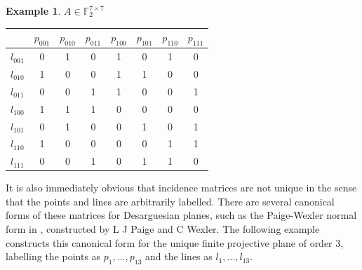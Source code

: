 \documentclass{report}
\newcommand{\F}{\mathbb{F}}
\theoremstyle{definition}\newtheorem*{definition}{Definition}
\theoremstyle{definition}\newtheorem*{example}{Example}
\theoremstyle{remark}\newtheorem*{remark}{Remark}
\begin{document}
\begin{example}
$ A \in \F_2^{7 \times 7} $ \\
\begin{center}
\begin{tabular}{|c|c|c|c|c|c|c|c|}
\hline
& $ p_{001} $ & $ p_{010} $ & $ p_{011} $ & $ p_{100} $ & $ p_{101} $ & $ p_{110} $ & $ p_{111} $ \\
\hline
$ l_{001} $ & 0 & 1 & 0 & 1 & 0 & 1 & 0 \\
\hline
$ l_{010} $ & 1 & 0 & 0 & 1 & 1 & 0 & 0 \\
\hline
$ l_{011} $ & 0 & 0 & 1 & 1 & 0 & 0 & 1 \\
\hline
$ l_{100} $ & 1 & 1 & 1 & 0 & 0 & 0 & 0 \\
\hline
$ l_{101} $ & 0 & 1 & 0 & 0 & 1 & 0 & 1 \\
\hline
$ l_{110} $ & 1 & 0 & 0 & 0 & 0 & 1 & 1 \\
\hline
$ l_{111} $ & 0 & 0 & 1 & 0 & 1 & 1 & 0 \\
\hline
\end{tabular}
\end{center}
\end{example}

It is also immediately obvious that incidence matrices are not unique in the sense that the points and lines are arbitrarily labelled. There are several canonical forms of these matrices for Desarguesian planes, such as the Paige-Wexler normal form in \cite{paigewexler}, constructed by L J Paige and C Wexler. The following example constructs this canonical form for the unique finite projective plane of order 3, labelling the points as $ p_1, ..., p_{13} $ and the lines as $ l_1, ..., l_{13} $.
\end{document}
